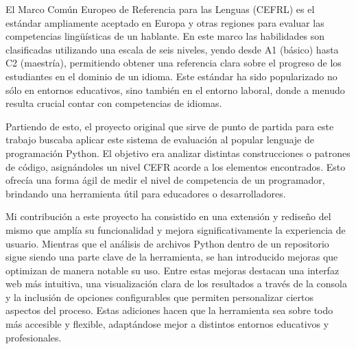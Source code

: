 \documentclass[a4paper, 12pt]{book}
\begin{document}




El Marco Común Europeo de Referencia para las Lenguas (CEFRL) es el estándar ampliamente aceptado en Europa y otras regiones para evaluar las competencias lingüísticas de un hablante. En este marco las habilidades son clasificadas utilizando una escala de seis niveles, yendo desde A1 (básico) hasta C2 (maestría), permitiendo obtener una referencia clara sobre el progreso de los estudiantes en el dominio de un idioma. Este estándar ha sido popularizado no sólo en entornos educativos, sino también en el entorno laboral, donde a menudo resulta crucial contar con competencias de idiomas.

Partiendo de esto, el proyecto original que sirve de punto de partida para este trabajo buscaba aplicar este sistema de evaluación al popular lenguaje de programación Python. El objetivo era analizar  distintas construcciones o patrones de código, asignándoles un nivel CEFR acorde a los elementos encontrados. Esto ofrecía una forma ágil de medir el nivel de competencia de un programador, brindando una herramienta útil para educadores o desarrolladores.

Mi contribución a este proyecto ha consistido en una extensión y rediseño del mismo que amplía su funcionalidad y mejora significativamente la experiencia de usuario. Mientras que el análisis de archivos Python dentro de un repositorio sigue siendo una parte clave de la herramienta, se han introducido mejoras que optimizan de manera notable su uso. Entre estas mejoras destacan una interfaz web más intuitiva, una visualización clara de los resultados a través de la consola y la inclusión de opciones configurables que permiten personalizar ciertos aspectos del proceso. Estas adiciones hacen que la herramienta sea sobre todo más accesible y flexible, adaptándose mejor a distintos entornos educativos y profesionales.
\end{document}
